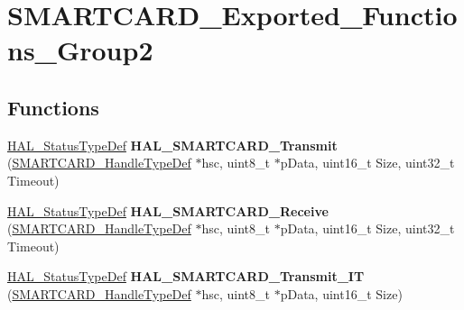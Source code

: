 \hypertarget{group___s_m_a_r_t_c_a_r_d___exported___functions___group2}{}\section{S\+M\+A\+R\+T\+C\+A\+R\+D\+\_\+\+Exported\+\_\+\+Functions\+\_\+\+Group2}
\label{group___s_m_a_r_t_c_a_r_d___exported___functions___group2}
\subsection*{Functions}
\begin{DoxyCompactItemize}
\item 
\hyperlink{stm32f4xx__hal__def_8h_a63c0679d1cb8b8c684fbb0632743478f}{H\+A\+L\+\_\+\+Status\+Type\+Def} {\bfseries H\+A\+L\+\_\+\+S\+M\+A\+R\+T\+C\+A\+R\+D\+\_\+\+Transmit} (\hyperlink{struct_s_m_a_r_t_c_a_r_d___handle_type_def}{S\+M\+A\+R\+T\+C\+A\+R\+D\+\_\+\+Handle\+Type\+Def} $\ast$hsc, uint8\+\_\+t $\ast$p\+Data, uint16\+\_\+t Size, uint32\+\_\+t Timeout)\hypertarget{group___s_m_a_r_t_c_a_r_d___exported___functions___group2_ga4dd0a7c6916ca2423c50f432a38a7328}{}\label{group___s_m_a_r_t_c_a_r_d___exported___functions___group2_ga4dd0a7c6916ca2423c50f432a38a7328}

\item 
\hyperlink{stm32f4xx__hal__def_8h_a63c0679d1cb8b8c684fbb0632743478f}{H\+A\+L\+\_\+\+Status\+Type\+Def} {\bfseries H\+A\+L\+\_\+\+S\+M\+A\+R\+T\+C\+A\+R\+D\+\_\+\+Receive} (\hyperlink{struct_s_m_a_r_t_c_a_r_d___handle_type_def}{S\+M\+A\+R\+T\+C\+A\+R\+D\+\_\+\+Handle\+Type\+Def} $\ast$hsc, uint8\+\_\+t $\ast$p\+Data, uint16\+\_\+t Size, uint32\+\_\+t Timeout)\hypertarget{group___s_m_a_r_t_c_a_r_d___exported___functions___group2_ga82240fa2bcafd64a28ffbb1b01893e84}{}\label{group___s_m_a_r_t_c_a_r_d___exported___functions___group2_ga82240fa2bcafd64a28ffbb1b01893e84}

\item 
\hyperlink{stm32f4xx__hal__def_8h_a63c0679d1cb8b8c684fbb0632743478f}{H\+A\+L\+\_\+\+Status\+Type\+Def} {\bfseries H\+A\+L\+\_\+\+S\+M\+A\+R\+T\+C\+A\+R\+D\+\_\+\+Transmit\+\_\+\+IT} (\hyperlink{struct_s_m_a_r_t_c_a_r_d___handle_type_def}{S\+M\+A\+R\+T\+C\+A\+R\+D\+\_\+\+Handle\+Type\+Def} $\ast$hsc, uint8\+\_\+t $\ast$p\+Data, uint16\+\_\+t Size)\hypertarget{group___s_m_a_r_t_c_a_r_d___exported___functions___group2_gab671c1bdba9ed83fb08142c4c38caee8}{}\label{group___s_m_a_r_t_c_a_r_d___exported___functions___group2_gab671c1bdba9ed83fb08142c4c38caee8}


\end{DoxyCompactItemize}
